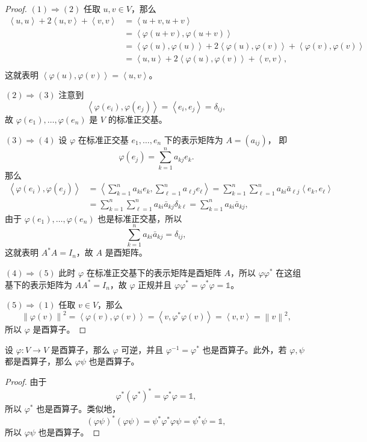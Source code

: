 \documentclass[fontset=none,zihao=-4]{Notes}
\newcommand{\inn}[1]{\left\langle#1\right\rangle}
\newcommand{\norm}[1]{\left\lVert#1\right\rVert}
\begin{document}
\begin{proof}
  $(1)\Rightarrow (2)$ 任取 $u,v\in V$，那么
  \begin{align*}
    \inn{u,u}+2\inn{u,v}+\inn{v,v}&=\inn{u+v,u+v}\\
    &=\inn{\varphi(u+v),\varphi(u+v)}  \\
    &=
    \inn{\varphi(u),\varphi(u)}+2\inn{\varphi(u),\varphi(v)}+\inn{\varphi(v),\varphi(v)}\\
    &=\inn{u,u}+2\inn{\varphi(u),\varphi(v)}+\inn{v,v},\\
  \end{align*}
  这就表明 $\inn{\varphi(u),\varphi(v)}=\inn{u,v}$。

  $(2)\Rightarrow(3)$ 注意到
  \[
    \inn{\varphi(e_i),\varphi(e_j)}=\inn{e_i,e_j}=\delta_{ij},  
  \]
  故 $\varphi(e_1),\dots,\varphi(e_n)$ 是 $V$ 的标准正交基。

  $(3)\Rightarrow (4)$ 设 $\varphi$ 在标准正交基 $e_1,\dots,e_n$ 下的表示矩阵为 $A=(a_{ij})$，
  即
  \[
    \varphi(e_j)=\sum_{k=1}^n a_{kj}e_k.  
  \]
  那么
  \begin{align*}
    \inn{\varphi(e_i),\varphi(e_j)}&=\inn{\sum_{k=1}^n a_{ki}e_k,\sum_{\ell=1}^n a_{\ell j}e_{\ell}}  
    =\sum_{k=1}^n\sum_{\ell=1}^n a_{ki}\bar a_{\ell j}\inn{e_k,e_{\ell}}\\
    &=\sum_{k=1}^n\sum_{\ell=1}^n a_{ki}\bar a_{kj}\delta_{k\ell}
    =\sum_{k=1}^na_{ki}\bar a_{kj},
  \end{align*}
  由于 $\varphi(e_1),\dots,\varphi(e_n)$ 也是标准正交基，所以
  \[
    \sum_{k=1}^na_{ki}\bar a_{kj}=\delta_{ij},
  \]
  这就表明 $A^*A=I_n$，故 $A$ 是酉矩阵。

  $(4)\Rightarrow (5)$ 此时 $\varphi$ 在标准正交基下的表示矩阵是酉矩阵
  $A$，所以 $\varphi\varphi^*$ 在这组基下的表示矩阵为 $AA^*=I_n$，故
  $\varphi$ 正规并且 $\varphi\varphi^*=\varphi^*\varphi=\mathbb{1}$。

  $(5)\Rightarrow (1)$ 任取 $v\in V$，那么
  \[
    \norm{\varphi(v)}^2=\inn{\varphi(v),\varphi(v)}=\inn{v,\varphi^*\varphi(v)}
    =\inn{v,v} =\norm{v}^2, 
  \]
  所以 $\varphi$ 是酉算子。
\end{proof}

\begin{corollary}\label{coro:group of On}
  设 $\varphi:V\to V$ 是酉算子，那么 $\varphi$ 可逆，并且 $\varphi^{-1}=\varphi^*$
  也是酉算子。此外，若 $\varphi,\psi$ 都是酉算子，那么 $\varphi\psi$ 也是酉算子。
\end{corollary}
\begin{proof}
  由于
  \[
    \varphi^*(\varphi^*)^*=\varphi^*\varphi=\mathbb{1},  
  \]
  所以 $\varphi^*$ 也是酉算子。类似地，
  \[
    (\varphi\psi)^*(\varphi\psi)=\psi^*\varphi^*\varphi\psi=\psi^*\psi=\mathbb{1},  
  \]
  所以 $\varphi\psi$ 也是酉算子。 
\end{proof}
\end{document}
